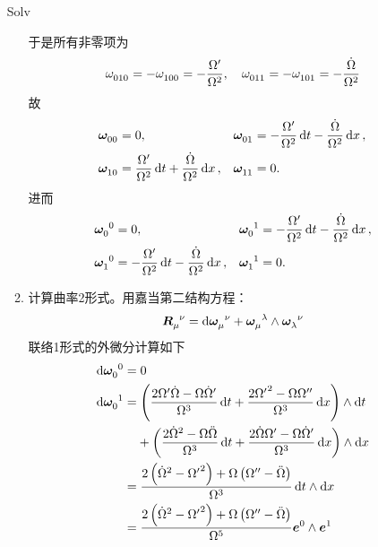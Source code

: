 \begin{xiti}
\begin{jie}
\begin{enumerate}
\begin{yl}{Solv}
\begin{enumerate}[leftmargin=2em]
					于是所有非零项为
					\begin{displaymath}
					\tensor{\omega}{_0_1_0} = - \tensor{\omega}{_1_0_0} = - \frac{\Omega^\prime}{\Omega^2} \qc \tensor{\omega}{_0_1_1} = - \tensor{\omega}{_1_0_1} = - \frac{\dot{\Omega}}{\Omega^2}
					\end{displaymath}
					故
					\begin{align*}
					\tensor{\bm{\omega}}{_0_0} &= 0, & \tensor{\bm{\omega}}{_0_1} &= - \frac{\Omega^\prime}{\Omega^2} \dd{t} - \frac{\dot{\Omega}}{\Omega^2} \dd{x},\\
					\tensor{\bm{\omega}}{_1_0} &= \frac{\Omega^\prime}{\Omega^2} \dd{t} + \frac{\dot{\Omega}}{\Omega^2} \dd{x}, & \tensor{\bm{\omega}}{_1_1} &= 0.
					\end{align*}
					进而
					\begin{align*}
					\tensor{\bm{\omega}}{_0^0} &= 0, & \tensor{\bm{\omega}}{_0^1} &= - \frac{\Omega^\prime}{\Omega^2} \dd{t} - \frac{\dot{\Omega}}{\Omega^2} \dd{x},\\
					\tensor{\bm{\omega}}{_1^0} &= - \frac{\Omega^\prime}{\Omega^2} \dd{t} - \frac{\dot{\Omega}}{\Omega^2} \dd{x}, & \tensor{\bm{\omega}}{_1^1} &= 0.
					\end{align*}
					\item 计算曲率2形式。用嘉当第二结构方程：
					\begin{displaymath}
					\tensor{\bm{R}}{_\mu^\nu} = \dd{\tensor{\bm{\omega}}{_\mu^\nu}} + \tensor{\bm{\omega}}{_\mu^\lambda} \wedge \tensor{\bm{\omega}}{_\lambda^\nu}
					\end{displaymath}
					联络1形式的外微分计算如下
					\begin{align*}
					\dd{\tensor{\bm{\omega}}{_0^0}} =&\; 0\\
					\dd{\tensor{\bm{\omega}}{_0^1}} =&\tmu \left( \frac{2\Omega^\prime \dot{\Omega} - \Omega \dot{\Omega}^\prime}{\Omega^3} \dd{t} + \frac{2{\Omega^\prime}^2 - \Omega \Omega''}{\Omega^3} \dd{x} \right) \wedge \dd{t} \\
					&+ \left( \frac{2 \dot{\Omega}^2- \Omega \ddot{\Omega}}{\Omega^3} \dd{t} + \frac{2\dot{\Omega}\Omega^\prime - \Omega \dot{\Omega}^\prime}{\Omega^3} \dd{x} \right) \wedge \dd{x}\\
					=& \mspace{5mu} \frac{2\left(\dot{\Omega}^2 - {\Omega^\prime}^2\right) + \Omega \left(\Omega'' - \ddot{\Omega}\right)}{\Omega^3} \dd{t} \wedge \dd{x}\\
					=& \mspace{5mu} \frac{2\left(\dot{\Omega}^2 - {\Omega^\prime}^2\right) + \Omega \left(\Omega'' - \ddot{\Omega}\right)}{\Omega^5} \bm{e}^0 \wedge \bm{e}^1\\

\end{align*}
\end{enumerate}
\end{yl}
\end{enumerate}
\end{jie}
\end{xiti}
